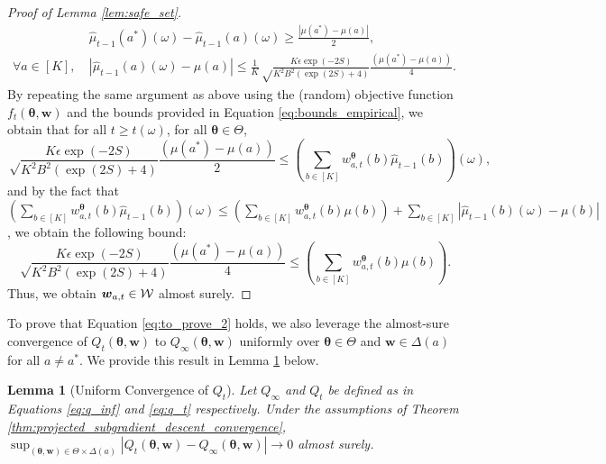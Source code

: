 \documentclass{article}
\newtheorem{lemma}{Lemma}
\begin{document}
\begin{appendices}
\begin{proof}[Proof of Lemma \ref{lem:safe_set}]
    \begin{align}
        &\hat\mu_{t-1}(a^*)(\omega) -\hat\mu_{t-1}(a)(\omega)  \geq \frac{|\mu(a^*) -\mu(a)|}{2}, \\
       \forall a \in [K], \  &\left|\hat\mu_{t-1}(a)(\omega) - \mu(a)\right| \leq \frac{1}{K}\sqrt\frac{K\epsilon\exp(-2S)}{K^2B^2(\exp(2S)+4)}\frac{(\mu(a^*)-\mu(a))}{4}.
    \end{align}
    By repeating the same argument as above using the (random) objective function $f_t(\bm{\theta}, \bm{w})$ and the bounds provided in Equation \eqref{eq:bounds_empirical}, we obtain that for all $t \geq t(\omega)$, for all $\bm{\theta} \in \Theta$, 
    \begin{equation}\label{eq:bounds}
        \sqrt\frac{K\epsilon\exp(-2S)}{K^2B^2(\exp(2S)+4)}\frac{(\mu(a^*)-\mu(a))}{2} \leq \left( \sum_{b \in [K]} w_{a,t}^{\bm\theta}(b) \hat\mu_{t-1}(b)\right) (\omega),
    \end{equation}
    and by the fact that $\left( \sum_{b \in [K]} w_{a,t}^{\bm\theta}(b) \hat\mu_{t-1}(b)\right) (\omega) \leq \left(\sum_{b\in [K]}w_{a,t}^{\bm\theta}(b) \mu(b)\right) + \sum_{b \in [K]}|\hat\mu_{t-1}(b)(\omega)-\mu(b)|$, we obtain the following bound:
    \begin{equation}
        \sqrt\frac{K\epsilon\exp(-2S)}{K^2B^2(\exp(2S)+4)}\frac{(\mu(a^*)-\mu(a))}{4} \leq \left( \sum_{b \in [K]} w_{a,t}^{\bm\theta}(b) \mu(b)\right).
    \end{equation}
    Thus, we obtain $\boldsymbol{w}_{a,t} \in \mathcal{W}$ almost surely. 
\end{proof}

To prove that Equation \eqref{eq:to_prove_2} holds, we also leverage the almost-sure convergence of $Q_t(\bm\theta, \bm{w})$ to $Q_\infty(\bm{\theta}, \bm{w})$ uniformly over $\bm{\theta} \in \Theta$ and $\bm{w} \in \Delta(a)$ for all $a \neq a^*$. We provide this result in Lemma \ref{lem:convergence_q} below.

\begin{lemma}[Uniform Convergence of $Q_t$]\label{lem:convergence_q}
    Let $Q_\infty$ and $Q_t$ be defined as in Equations \eqref{eq:q_inf} and \eqref{eq:q_t} respectively. Under the assumptions of Theorem \ref{thm:projected_subgradient_descent_convergence}, $\sup_{(\bm{\theta}, \bm{w}) \in \Theta \times \Delta(a)}| Q_t(\bm{\theta}, \bm{w}) - Q_\infty(\bm{\theta}, \bm{w})| \rightarrow 0$ almost surely. 
\end{lemma}


\end{appendices}
\end{document}
